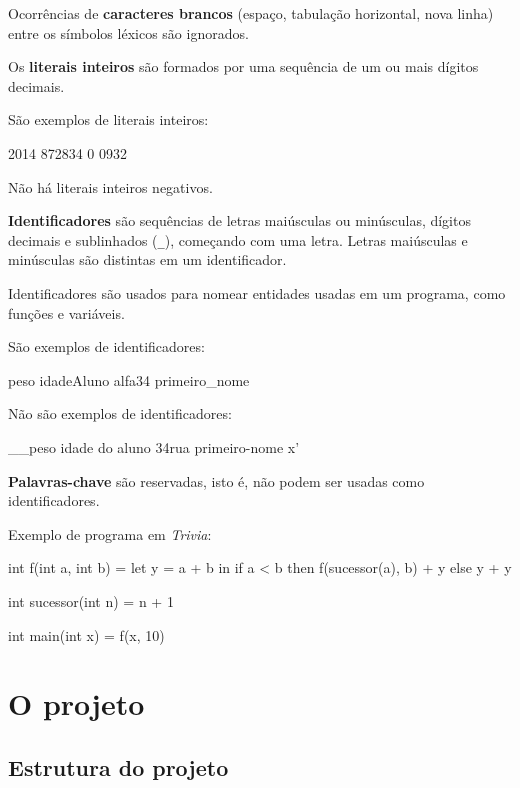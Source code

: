 \documentclass[a4paper,11pt,brazil]{article}
\newcommand{\lang}{\textsl{Trivia}}
\begin{document}
Ocorrências de \textbf{caracteres brancos} (espaço, tabulação
horizontal, nova linha) entre os símbolos léxicos são ignorados.

Os \textbf{literais inteiros} são formados por uma sequência de um ou
mais dígitos decimais.

São exemplos de literais inteiros:
\begin{pygmented}[lang=text]
2014
872834
0
0932
\end{pygmented}

Não há literais inteiros negativos.

\textbf{Identificadores} são sequências de letras maiúsculas ou
minúsculas, dígitos decimais e sublinhados (\texttt{\_}), começando
com uma letra. Letras maiúsculas e minúsculas são distintas em um
identificador.

Identificadores são usados para nomear entidades usadas em um
programa, como funções e variáveis.

São exemplos de identificadores:
\begin{pygmented}[lang=text]
peso
idadeAluno
alfa34
primeiro_nome
\end{pygmented}

Não são exemplos de identificadores:
\begin{pygmented}[lang=text]
__peso
idade do aluno
34rua
primeiro-nome
x'
\end{pygmented}

\textbf{Palavras-chave} são reservadas, isto é, não podem ser usadas
como identificadores.

Exemplo de programa em \lang{}:
\begin{pygmented}[lang=text]
int f(int a, int b) =
  let y = a + b
  in
    if a < b then
      f(sucessor(a), b) + y
    else
      y + y

int sucessor(int n) =
  n + 1

int main(int x) =
  f(x, 10)
\end{pygmented}

\section{O projeto}

\subsection{Estrutura do projeto}
\end{document}
